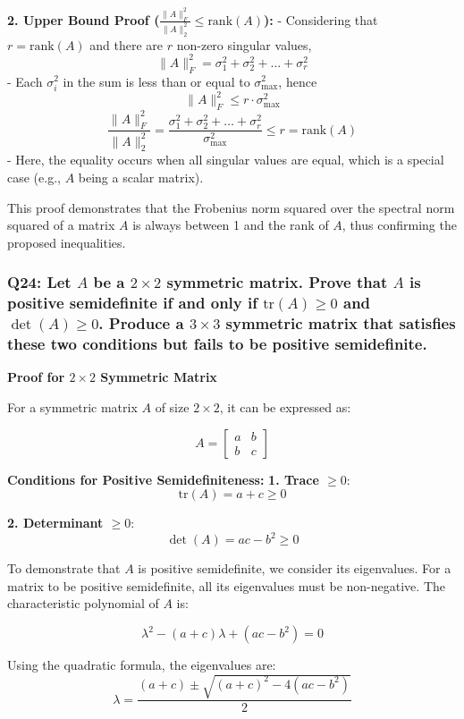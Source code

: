 \documentclass[8pt]{article}
\begin{document}
\textbf{2. Upper Bound Proof (\(\frac{\|A\|_F^2}{\|A\|_2^2} \leq \text{rank}(A)\)):}
   - Considering that \( r = \text{rank}(A) \) and there are \( r \) non-zero singular values,
   \[
   \|A\|_F^2 = \sigma_1^2 + \sigma_2^2 + \ldots + \sigma_r^2
   \]
   - Each \( \sigma_i^2 \) in the sum is less than or equal to \( \sigma_{\text{max}}^2 \), hence
   \[
   \|A\|_F^2 \leq r \cdot \sigma_{\text{max}}^2
   \]
   \[
   \frac{\|A\|_F^2}{\|A\|_2^2} = \frac{\sigma_1^2 + \sigma_2^2 + \ldots + \sigma_r^2}{\sigma_{\text{max}}^2} \leq r = \text{rank}(A)
   \]
   - Here, the equality occurs when all singular values are equal, which is a special case (e.g., \( A \) being a scalar matrix).

This proof demonstrates that the Frobenius norm squared over the spectral norm squared of a matrix \( A \) is always between 1 and the rank of \( A \), thus confirming the proposed inequalities.

\subsubsection*{Q24: Let \(A\) be a \(2 \times 2\) symmetric matrix. Prove that \(A\) is positive semidefinite if and only if \(\text{tr}(A) \geq 0\) and \(\det(A) \geq 0\). Produce a \(3 \times 3\) symmetric matrix that satisfies these two conditions but fails to be positive semidefinite.}

\textbf{Proof for \(2 \times 2\) Symmetric Matrix}

For a symmetric matrix \( A \) of size \(2 \times 2\), it can be expressed as:

\[
A = \begin{bmatrix}
a & b \\
b & c
\end{bmatrix}
\]

\textbf{Conditions for Positive Semidefiniteness:}
\textbf{1. Trace \( \geq 0 \)}:
   \[
   \text{tr}(A) = a + c \geq 0
   \]

\textbf{2. Determinant \( \geq 0 \)}:
   \[
   \det(A) = ac - b^2 \geq 0
   \]

To demonstrate that \( A \) is positive semidefinite, we consider its eigenvalues. For a matrix to be positive semidefinite, all its eigenvalues must be non-negative. The characteristic polynomial of \( A \) is:

\[
\lambda^2 - (a+c)\lambda + (ac - b^2) = 0
\]

Using the quadratic formula, the eigenvalues are:
\[
\lambda = \frac{(a+c) \pm \sqrt{(a+c)^2 - 4(ac-b^2)}}{2}
\]
\end{document}

